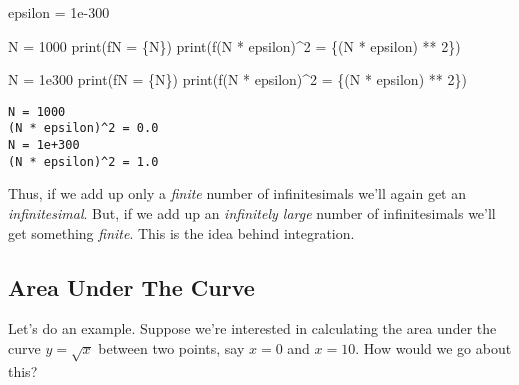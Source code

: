 \documentclass[
  letterpaper,
  DIV=11,
  numbers=noendperiod]{scrreprt}
\newenvironment{Shaded}{\begin{snugshade}}{\end{snugshade}}
\newcommand{\BuiltInTok}[1]{\textcolor[rgb]{0.00,0.23,0.31}{#1}}
\newcommand{\DecValTok}[1]{\textcolor[rgb]{0.68,0.00,0.00}{#1}}
\newcommand{\FloatTok}[1]{\textcolor[rgb]{0.68,0.00,0.00}{#1}}
\newcommand{\KeywordTok}[1]{\textcolor[rgb]{0.00,0.23,0.31}{#1}}
\newcommand{\NormalTok}[1]{\textcolor[rgb]{0.00,0.23,0.31}{#1}}
\newcommand{\OperatorTok}[1]{\textcolor[rgb]{0.37,0.37,0.37}{#1}}
\newcommand{\SpecialCharTok}[1]{\textcolor[rgb]{0.37,0.37,0.37}{#1}}
\newcommand{\SpecialStringTok}[1]{\textcolor[rgb]{0.13,0.47,0.30}{#1}}
\newcommand{\StringTok}[1]{\textcolor[rgb]{0.13,0.47,0.30}{#1}}
\begin{document}
\begin{Shaded}
\begin{Highlighting}[]
\NormalTok{epsilon }\OperatorTok{=} \FloatTok{1e{-}300}

\NormalTok{N }\OperatorTok{=} \DecValTok{1000}
\BuiltInTok{print}\NormalTok{(}\SpecialStringTok{f\textquotesingle{}N = }\SpecialCharTok{\{}\NormalTok{N}\SpecialCharTok{\}}\SpecialStringTok{\textquotesingle{}}\NormalTok{)}
\BuiltInTok{print}\NormalTok{(}\SpecialStringTok{f\textquotesingle{}(N * epsilon)\^{}2 = }\SpecialCharTok{\{}\NormalTok{(N }\OperatorTok{*}\NormalTok{ epsilon) }\OperatorTok{**} \DecValTok{2}\SpecialCharTok{\}}\SpecialStringTok{\textquotesingle{}}\NormalTok{)}

\NormalTok{N }\OperatorTok{=} \FloatTok{1e300}
\BuiltInTok{print}\NormalTok{(}\SpecialStringTok{f\textquotesingle{}N = }\SpecialCharTok{\{}\NormalTok{N}\SpecialCharTok{\}}\SpecialStringTok{\textquotesingle{}}\NormalTok{)}
\BuiltInTok{print}\NormalTok{(}\SpecialStringTok{f\textquotesingle{}(N * epsilon)\^{}2 = }\SpecialCharTok{\{}\NormalTok{(N }\OperatorTok{*}\NormalTok{ epsilon) }\OperatorTok{**} \DecValTok{2}\SpecialCharTok{\}}\SpecialStringTok{\textquotesingle{}}\NormalTok{)}
\end{Highlighting}
\end{Shaded}

\begin{verbatim}
N = 1000
(N * epsilon)^2 = 0.0
N = 1e+300
(N * epsilon)^2 = 1.0
\end{verbatim}

Thus, if we add up only a \emph{finite} number of infinitesimals we'll
again get an \emph{infinitesimal}. But, if we add up an \emph{infinitely
large} number of infinitesimals we'll get something \emph{finite}. This
is the idea behind integration.

\hypertarget{area-under-the-curve}{%
\subsection{Area Under The Curve}\label{area-under-the-curve}}

Let's do an example. Suppose we're interested in calculating the area
under the curve \(y=\sqrt{x}\) between two points, say \(x=0\) and
\(x=10\). How would we go about this?

\begin{Shaded}
\end{Shaded}
\end{document}
